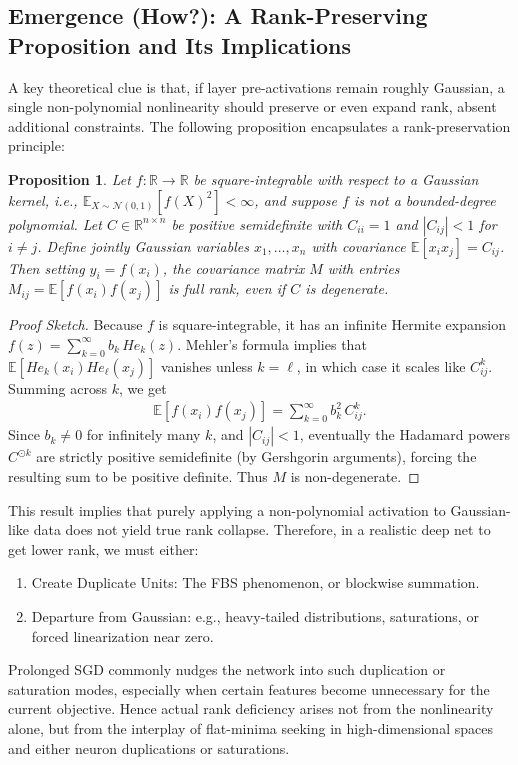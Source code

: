 \documentclass[11pt]{article}
\newtheorem{proposition}{Proposition}[section]
\begin{document}
\subsection{Emergence (How?): A Rank-Preserving Proposition and Its Implications}
A key theoretical clue is that, if layer pre-activations remain roughly Gaussian, a single non-polynomial nonlinearity should preserve or even expand rank, absent additional constraints. The following proposition encapsulates a rank-preservation principle:

\begin{proposition}
\label{prop:RankPreservation}
Let $ f: \mathbb{R} \to \mathbb{R}$ be square-integrable with respect to a Gaussian kernel, i.e., $\mathbb{E}_{X\sim \mathcal{N}(0,1)}[f(X)^2] < \infty$, and suppose $f$ is not a bounded-degree polynomial. Let $C\in \mathbb{R}^{n\times n}$ be positive semidefinite with $C_{ii}=1$ and $|C_{ij}|<1$ for $i\neq j$. Define jointly Gaussian variables $x_1,\dots,x_n$ with covariance $\mathbb{E}[x_ix_j]=C_{ij}$. Then setting $y_i = f(x_i)$, the covariance matrix $M$ with entries $M_{ij}=\mathbb{E}[f(x_i)f(x_j)]$ is full rank, even if $C$ is degenerate.
\end{proposition}

\begin{proof}[Proof Sketch]
Because $f$ is square-integrable, it has an infinite Hermite expansion $f(z)=\sum_{k=0}^{\infty} b_k\, He_k(z)$. Mehler's formula implies that $\mathbb{E}[He_k(x_i)He_\ell(x_j)]$ vanishes unless $k=\ell$, in which case it scales like $C_{ij}^k$. Summing across $k$, we get 
\begin{align*}
\mathbb{E}[f(x_i)f(x_j)] 
= 
\sum_{k=0}^{\infty} b_k^2\,C_{ij}^k.
\end{align*}
Since $b_k\neq 0$ for infinitely many $k$, and $|C_{ij}|<1$, eventually the Hadamard powers $C^{\odot k}$ are strictly positive semidefinite (by Gershgorin arguments), forcing the resulting sum to be positive definite. Thus $M$ is non-degenerate.
\end{proof}

This result implies that purely applying a non-polynomial activation to Gaussian-like data does not yield true rank collapse. Therefore, in a realistic deep net to get lower rank, we must either:
\begin{enumerate}
    \item Create Duplicate Units: The FBS phenomenon, or blockwise summation.
    \item Departure from Gaussian: e.g., heavy-tailed distributions, saturations, or forced linearization near zero.
\end{enumerate}
Prolonged SGD commonly nudges the network into such duplication or saturation modes, especially when certain features become unnecessary for the current objective. Hence actual rank deficiency arises not from the nonlinearity alone, but from the interplay of flat-minima seeking in high-dimensional spaces and either neuron duplications or saturations.
\end{document}
